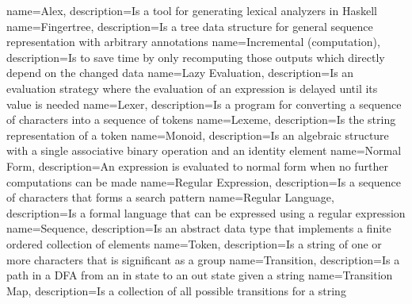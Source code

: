 
{
        name=Alex,
            description={Is a tool for generating lexical analyzers in Haskell}
}
{
        name=Fingertree,
            description={Is a tree data structure for general
            sequence representation with arbitrary annotations}
}
{
        name=Incremental (computation),
            description={Is to save time by only recomputing those outputs which
            directly depend on the changed data}
}
{
        name=Lazy Evaluation,
            description={Is an evaluation strategy where the evaluation of an
            expression is delayed until its value is needed}
}
{
        name=Lexer,
            description={Is a program for converting a sequence of characters
            into a sequence of tokens}
}
{
        name=Lexeme,
            description={Is the string representation of a token}
}
{
        name=Monoid,
            description={Is an algebraic structure with a single associative
            binary operation and an identity element}
}
{
        name=Normal Form,
            description={An expression is evaluated to normal form when no further
            computations can be made}
}
{
        name=Regular Expression,
            description={Is a sequence of characters that forms a search
            pattern}
}
{
        name=Regular Language,
            description={Is a formal language that can be expressed using a
            regular expression}
}
{
        name=Sequence,
            description={Is an abstract data type that implements a finite
            ordered collection of elements}
}
{
        name=Token,
            description={Is a string of one or more characters that is
            significant as a group}
}
{
        name=Transition,
            description={Is a path in a DFA from an in state to an out state
            given a string}
}
{
        name=Transition Map,
            description={Is a collection of all possible transitions for a
            string}
}
